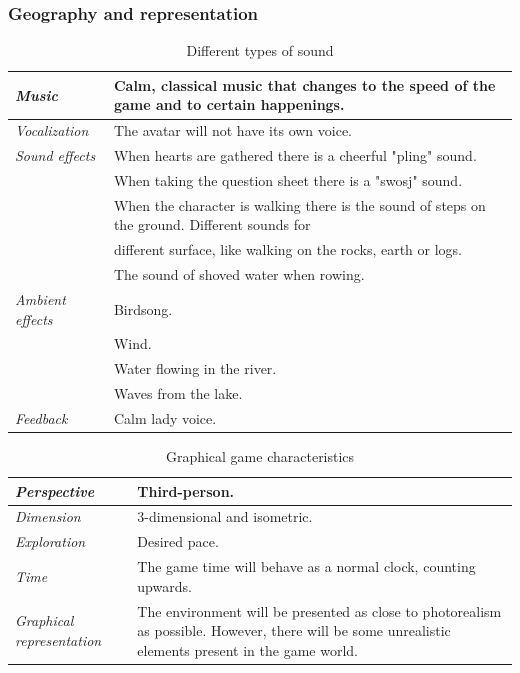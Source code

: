 \subsubsection{Geography and representation}

\begin{table} [H]
\centering
    \begin{tabular}{|p{}|p{}|}
       \hline
       \emph{Music} & Calm, classical music that changes to the speed of the game and to certain happenings. \\ \hline
       \emph{Vocalization} & The avatar will not have its own voice. \\ \hline
       \emph{Sound effects} &  When hearts are gathered there is a cheerful "pling" sound.  \\ \cline{2-2}
	    &  When taking the question sheet there is a "swosj" sound.\\ \cline{2-2}
	     & When the character is walking there is the sound of steps on the ground. Different sounds for \\ & different surface, like walking on the rocks, earth or logs.\\ \cline{2-2}
	       & The sound of shoved water when rowing. \\ \hline
	       \emph{Ambient effects} & Birdsong. \\ \cline{2-2}
	         & Wind. \\ \cline{2-2}
	         & Water flowing in the river. \\ \cline{2-2}
	         & Waves from the lake.\\ \hline
	         \emph{Feedback} & Calm lady voice. \\ \hline
    \end{tabular}
    \caption[Different types of sound]{Different types of sound}
    \label{tab:sound1}
\end{table}  

\begin{table} [H]
\centering
    \begin{tabular}{|p{}|p{}|}
       \hline
      \emph {Perspective} & Third-person. \\ \hline
       \emph{Dimension} &  3-dimensional and isometric. \\ \hline
	       \emph{Exploration} & Desired pace. \\ \hline
	       \emph{Time} & The game time will behave as a normal clock, counting upwards. \\ \hline
	       \emph{Graphical representation} & The environment will be presented as close to photorealism as possible.  However, there will be some unrealistic elements present in the game world.  \\ \hline
    \end{tabular}
    \caption[Graphical game characteristics]{Graphical game characteristics}
    \label{tab:graphical1}
\end{table}  

